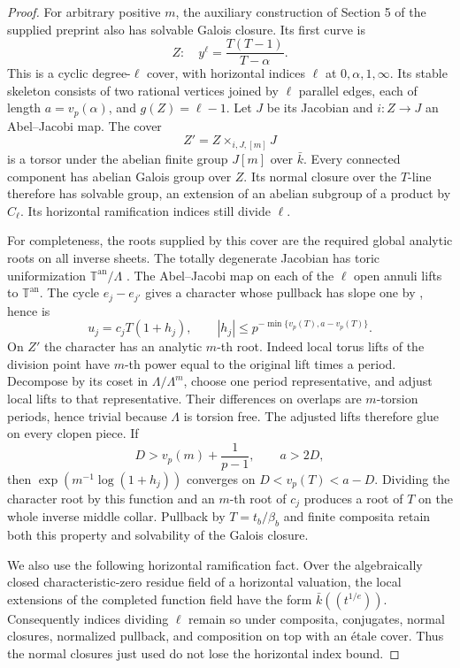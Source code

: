 \begin{proof}
For arbitrary positive $m$, the auxiliary construction of Section 5
of the supplied preprint also has solvable Galois closure.  Its
first curve is
\[
                  Z:\quad y^\ell=\frac{T(T-1)}{T-\alpha}.
\]
This is a cyclic degree-$\ell$ cover, with horizontal indices
$\ell$ at $0,\alpha,1,\infty$.  Its stable skeleton consists of
two rational vertices joined by $\ell$ parallel edges, each of
length $a=v_p(\alpha)$, and $g(Z)=\ell-1$.  Let $J$ be its
Jacobian and $i:Z\to J$ an Abel--Jacobi map.  The cover
\[
                       Z'=Z\times_{i,J,[m]}J
\]
is a torsor under the abelian finite group $J[m]$ over $\bar k$.
Every connected component has abelian Galois group over $Z$.
Its normal closure over the $T$-line therefore has solvable group,
an extension of an abelian subgroup of a product by $C_\ell$.
Its horizontal ramification indices still divide $\ell$.

For completeness, the roots supplied by this cover are the required
global analytic roots on all inverse sheets.  The totally degenerate
Jacobian has toric uniformization $\mathbb T^{\mathrm{an}}/\Lambda$ \cite[Sections 4.1--4.2 and 4.5.2]{DE_BakerRabinoff2015}.
The Abel--Jacobi map on each of the $\ell$ open annuli lifts to
$\mathbb T^{\mathrm{an}}$.  The cycle $e_j-e_{j'}$ gives a character
whose pullback has slope one by \cite[Proposition 6.1 and Corollary 6.6]{DE_BakerRabinoff2015}, hence is
\[
                 u_j=c_j T(1+h_j),\qquad
        |h_j|\le p^{-\min\{v_p(T),a-v_p(T)\}}.
\]
On $Z'$ the character has an analytic $m$-th root.  Indeed local
torus lifts of the division point have $m$-th power equal to the
original lift times a period.  Decompose by its coset in
$\Lambda/\Lambda^m$, choose one period representative, and adjust
local lifts to that representative.  Their differences on overlaps
are $m$-torsion periods, hence trivial because $\Lambda$ is torsion
free.  The adjusted lifts therefore glue on every clopen piece.
If
\[
        D>v_p(m)+\frac1{p-1},\qquad a>2D,
\]
then $\exp(m^{-1}\log(1+h_j))$ converges on
$D<v_p(T)<a-D$.  Dividing the character root by this function and
an $m$-th root of $c_j$ produces a root of $T$ on the whole inverse
middle collar.  Pullback by $T=t_b/\beta_b$ and finite composita
retain both this property and solvability of the Galois closure.

We also use the following horizontal ramification fact.  Over the
algebraically closed characteristic-zero residue field of a
horizontal valuation, the local extensions of the completed
function field have the form $\bar k((t^{1/e}))$.  Consequently
indices dividing $\ell$ remain so under composita, conjugates,
normal closures, normalized pullback, and composition on top with
an \'etale cover.  Thus the normal closures just used do not lose
the horizontal index bound.


\end{proof}
